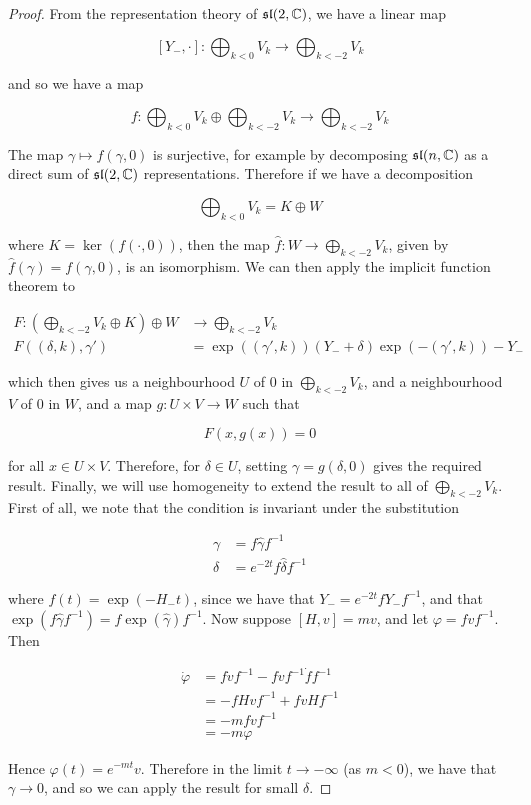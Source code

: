 \documentclass{report}
\renewcommand{\sl}{\mathfrak{sl}}
\begin{document}
\begin{proof}
    From the representation theory of \(\sl(2, \C)\), we have a linear map

    \[[Y_-, \cdot] : \bigoplus_{k < 0}V_k \to \bigoplus_{k < -2}V_k\]
    
    and so we have a map 

    \[f : \bigoplus_{k < 0}V_k \oplus \bigoplus_{k < -2}V_k \to \bigoplus_{k < -2}V_k\]
    
    The map \(\gamma \mapsto f(\gamma, 0)\) is surjective, for example by decomposing \(\sl(n, \C)\) as a direct sum of \(\sl(2, \C)\) representations. Therefore if we have a decomposition

    \[\bigoplus_{k < 0}V_k = K \oplus W\]

    where \(K = \ker(f(\cdot, 0))\), then the map \(\hat f : W \to \bigoplus\limits_{k < -2}V_k\), given by \(\hat f(\gamma) = f(\gamma, 0)\), is an isomorphism. We can then apply the implicit function theorem to

    \begin{align*}
        F : \left(\bigoplus_{k < -2}V_k \oplus K\right) \oplus W &\to \bigoplus_{k < -2}V_k \\
        F((\delta, k), \gamma') &= \exp((\gamma', k))(Y_- + \delta)\exp(-(\gamma', k)) - Y_-
    \end{align*}

    which then gives us a neighbourhood \(U\) of \(0\) in \(\bigoplus\limits_{k < -2}V_k\), and a neighbourhood \(V\) of \(0\) in \(W\), and a map \(g : U \times V \to W\) such that

    \[F(x, g(x)) = 0\]

    for all \(x \in U \times V\). Therefore, for \(\delta \in U\), setting \(\gamma = g(\delta, 0)\) gives the required result. Finally, we will use homogeneity to extend the result to all of \(\bigoplus \limits_{k < -2}V_k\). First of all, we note that the condition is invariant under the substitution

    \begin{align*}
        \gamma &= f\hat\gamma f^{-1} \\
        \delta &= e^{-2t}f\hat\delta f^{-1}
    \end{align*}

    where \(f(t) = \exp(-H_-t)\), since we have that \(Y_- = e^{-2t}fY_-f^{-1}\), and that \(\exp(f\hat\gamma f^{-1}) = f\exp(\hat\gamma)f^{-1}\). Now suppose \([H, v] = mv\), and let \(\varphi = fvf^{-1}\). Then

    \begin{align*}
        \dot\varphi &= f\dot vf^{-1} - fvf^{-1}\dot f f^{-1} \\
        &= -fHvf^{-1} + fvHf^{-1} \\
        &= -mfvf^{-1} \\
        &= -m\varphi
    \end{align*}

    Hence \(\varphi(t) = e^{-mt}v\). Therefore in the limit \(t \to -\infty\) (as \(m < 0\)), we have that \(\gamma \to 0\), and so we can apply the result for small \(\delta\).
\end{proof}
\end{document}
